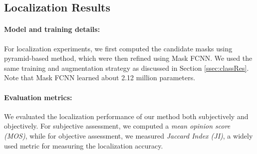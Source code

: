 \documentclass[10pt,twocolumn,letterpaper]{article}
\begin{document}
\begin{table}[b!]
\centering
{}
\setlength{\belowcaptionskip}{-4mm}
\caption{This table compares the top-1 accuracies of different models on our dataset.}
\label{tab:classRes}
\end{table}

\subsection{Localization Results}
\paragraph{Model and training details:} For localization experiments, we first computed the candidate masks using pyramid-based method, which were then refined using Mask FCNN. We used the  same training and augmentation strategy as discussed in Section \ref{ssec:classRes}. Note that Mask FCNN learned about 2.12 million parameters.

\vspace{-4mm}
\paragraph{Evaluation metrics:} We evaluated the localization performance of our method both subjectively and objectively. For subjective assessment, we computed a \textit{mean opinion score (MOS)}, while for objective assessment, we measured \textit{Jaccard Index (JI)}, a widely used metric for measuring the localization accuracy. 
\end{document}

